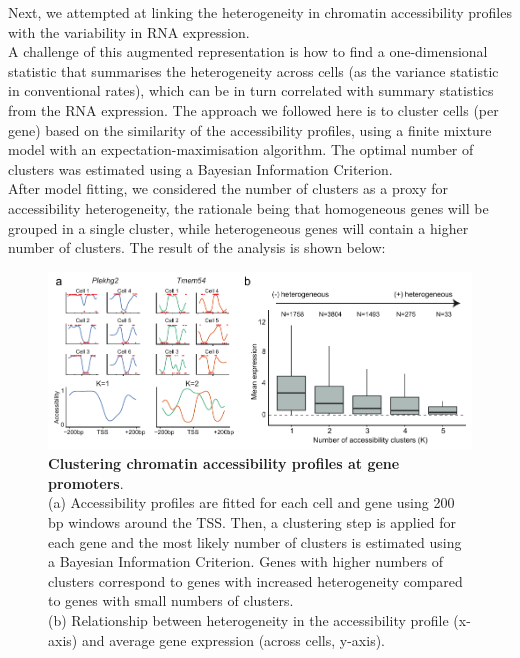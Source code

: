 Next, we attempted at linking the heterogeneity in chromatin accessibility profiles with the variability in RNA expression.\\
A challenge of this augmented representation is how to find a one-dimensional statistic that summarises the heterogeneity across cells (as the variance statistic in conventional rates), which can be in turn correlated with summary statistics from the RNA expression. The approach we followed here is to cluster cells (per gene) based on the similarity of the accessibility profiles, using a finite mixture model with an expectation-maximisation algorithm. The optimal number of clusters was estimated using a Bayesian Information Criterion.\\
After model fitting, we considered the number of clusters as a proxy for accessibility heterogeneity, the rationale being that homogeneous genes will be grouped in a single cluster, while heterogeneous genes will contain a higher number of clusters. The result of the analysis is shown below:\\

\begin{figure}[H]
	\centering
	\includegraphics[width=0.9\linewidth]{scNMT_profiles_clusters}
	\caption[]{
	\textbf{Clustering chromatin accessibility profiles at gene promoters}. \\
	(a) Accessibility profiles are fitted for each cell and gene using 200 bp windows around the TSS. Then, a clustering step is applied for each gene and the most likely number of clusters is estimated using a Bayesian Information Criterion. Genes with higher numbers of clusters correspond to genes with increased heterogeneity compared to genes with small numbers of clusters.\\
	(b) Relationship between heterogeneity in the accessibility profile (x-axis) and average gene expression (across cells, y-axis).
	}
	\label{fig:scnmt_profiles_clusters}
\end{figure}

